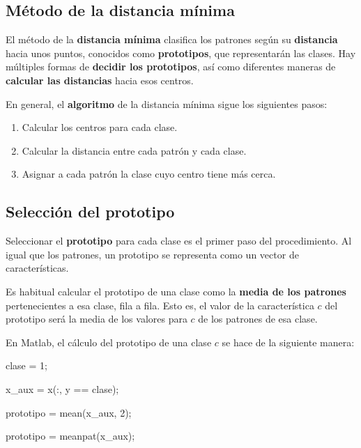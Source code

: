 \documentclass[11pt]{scrartcl}
\begin{document}
\subsection{Método de la distancia mínima}

El método de la \textbf{distancia mínima} clasifica los patrones según su
\textbf{distancia} hacia unos puntos, conocidos como \textbf{prototipos}, que
representarán las clases. Hay múltiples formas de \textbf{decidir los
  prototipos}, así como diferentes maneras de \textbf{calcular las distancias}
hacia esos centros.

En general, el \textbf{algoritmo} de la distancia mínima sigue los siguientes
pasos:

\begin{enumerate}
\item Calcular los centros para cada clase.
\item Calcular la distancia entre cada patrón y cada clase.
\item Asignar a cada patrón la clase cuyo centro tiene más cerca.
\end{enumerate}

\subsection{Selección del prototipo}

Seleccionar el \textbf{prototipo} para cada clase es el primer paso del
procedimiento. Al igual que los patrones, un prototipo se representa como un
vector de características.

Es habitual calcular el prototipo de una clase como la \textbf{media de los
  patrones} pertenecientes a esa clase, fila a fila. Esto es, el valor de la
característica $c$ del prototipo será la media de los valores para $c$ de los
patrones de esa clase.

En Matlab, el cálculo del prototipo de una clase $c$ se hace de la siguiente manera:

\begin{matlabcode}
clase = 1; 

x_aux = x(:, y == clase);  

prototipo = mean(x_aux, 2);

prototipo = meanpat(x_aux);
\end{matlabcode}
\end{document}
